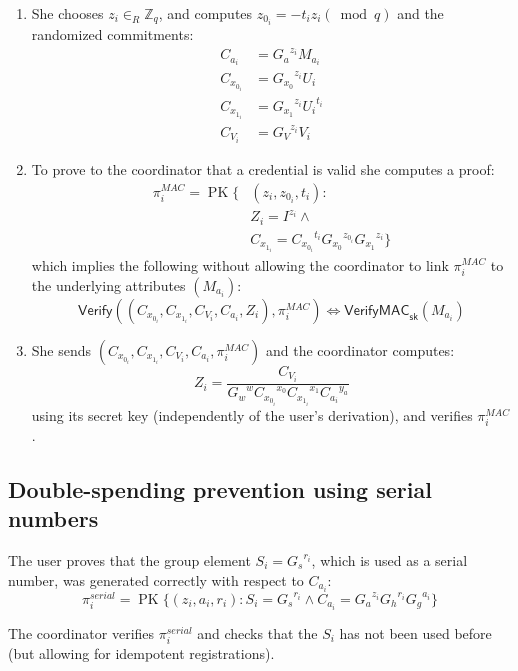 \documentclass[a4paper]{article}
\begin{document}
\begin{enumerate}

\item She chooses
$z_i \in_{R} \mathbb{Z}_{q}$, and computes
$z_{0_i}=-{t_i} {z_i} (\bmod q)$
and the randomized commitments:
\begin{align*}
C_{a_i}     &= {G_a}^{z_i} M_{a_i} \\
C_{x_{0_i}} &= {G_{x_0}}^{z_i} {U_i} \\
C_{x_{1_i}} &= {G_{x_1}}^{z_i} {U_i}^{t_i} \\
C_{V_i}     &= {G_V}^{z_i} V_i
\end{align*}

\item To prove to the coordinator that a credential is valid she computes a proof:
\begin{align*}
\pi_{i}^{\mathit{MAC}}=\operatorname{PK}\{
& (z_i, z_{0_i},t_i): \\
& Z_i =I^{z_i} \land \\
& C_{x_{1_i}} = {C_{x_{0_i}}}^{t_i} {G_{x_0}}^{z_{0_i}} {G_{x_1}}^{z_i} \}
\end{align*}
which implies the following without allowing the coordinator to link $\pi_{i}^\mathit{MAC}$ to the underlying attributes $(M_{a_i})$:
\[
\mathsf{Verify}((C_{x_{0_i}}, C_{x_{1_i}}, C_{V_i}, C_{a_i}, Z_i), \pi_i^{\mathit{MAC}})
\iff
\mathsf{VerifyMAC}_{\mathsf{sk}}(M_{a_i})
\]

\item She sends $(C_{x_{0_i}}, C_{x_{1_i}}, C_{V_i}, C_{a_i},\pi_i^{\mathit{MAC}})$ and the coordinator computes:
\[
Z_i=\frac{C_{V_i}}{{G_w}^w {C_{x_{0_i}}}^{x_0} {C_{x_{1_i}}}^{x_{1}}
{C_{a_i}}^{y_a}
}
\]
using its secret key (independently of the user's derivation), and verifies $\pi_i^{\mathit{MAC}}$.

\end{enumerate}

\subsection{Double-spending prevention using serial numbers}\label{serial}

The user proves that the group element $S_i = {G_s}^{r_i}$, which is used as a serial number, was generated correctly with respect to $C_{a_i}$:
\[ \pi_{i}^{\mathit{serial}}=\operatorname{PK}\{ (z_i,a_i,r_i): S_i = {G_s}^{r_i} \land C_{a_i} = {G_a}^{z_i}{G_h}^{r_i}{G_g}^{a_i} \} \]

The coordinator verifies $\pi_{i}^{\mathit{serial}}$ and checks that the $S_i$ has not been used before (but allowing for idempotent registrations).
\end{document}
